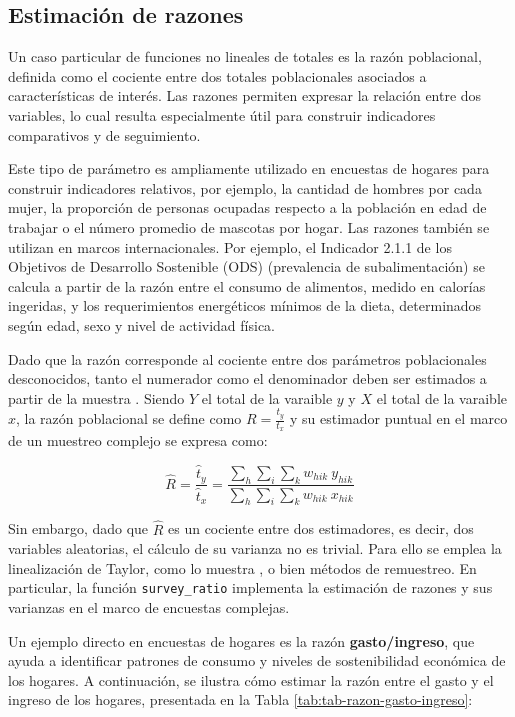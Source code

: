 \documentclass[
  spanish,
  12pt,
]{book}
\begin{document}
\subsection{Estimación de razones}\label{estimacion-de-razones}

Un caso particular de funciones no lineales de totales es la razón poblacional, definida como el cociente entre dos totales poblacionales asociados a características de interés. Las razones permiten expresar la relación entre dos variables, lo cual resulta especialmente útil para construir indicadores comparativos y de seguimiento.

Este tipo de parámetro es ampliamente utilizado en encuestas de hogares para construir indicadores relativos, por ejemplo, la cantidad de hombres por cada mujer, la proporción de personas ocupadas respecto a la población en edad de trabajar o el número promedio de mascotas por hogar. Las razones también se utilizan en marcos internacionales. Por ejemplo, el Indicador 2.1.1 de los Objetivos de Desarrollo Sostenible (ODS) (prevalencia de subalimentación) se calcula a partir de la razón entre el consumo de alimentos, medido en calorías ingeridas, y los requerimientos energéticos mínimos de la dieta, determinados según edad, sexo y nivel de actividad física.

Dado que la razón corresponde al cociente entre dos parámetros poblacionales desconocidos, tanto el numerador como el denominador deben ser estimados a partir de la muestra \citep{bautista1998}. Siendo \(Y\) el total de la varaible \(y\) y \(X\) el total de la varaible \(x\), la razón poblacional se define como \(R = \frac{t_y}{t_x}\) y su estimador puntual en el marco de un muestreo complejo se expresa como:

\[
\hat{R} = \frac{\hat{t}_y}{\hat{t}_x}
= \frac{\sum_{h}\sum_{i}\sum_{k} w_{hik} \ y_{hik}}
       {\sum_{h}\sum_{i}\sum_{k} w_{hik} \ x_{hik}}
\]

Sin embargo, dado que \(\hat{R}\) es un cociente entre dos estimadores, es decir, dos variables aleatorias, el cálculo de su varianza no es trivial. Para ello se emplea la linealización de Taylor, como lo muestra \citet{Gutierrez2016}, o bien métodos de remuestreo. En particular, la función \texttt{survey\_ratio} implementa la estimación de razones y sus varianzas en el marco de encuestas complejas.

Un ejemplo directo en encuestas de hogares es la razón \textbf{gasto/ingreso}, que ayuda a identificar patrones de consumo y niveles de sostenibilidad económica de los hogares. A continuación, se ilustra cómo estimar la razón entre el gasto y el ingreso de los hogares, presentada en la Tabla \ref{tab:tab-razon-gasto-ingreso}:
\end{document}
